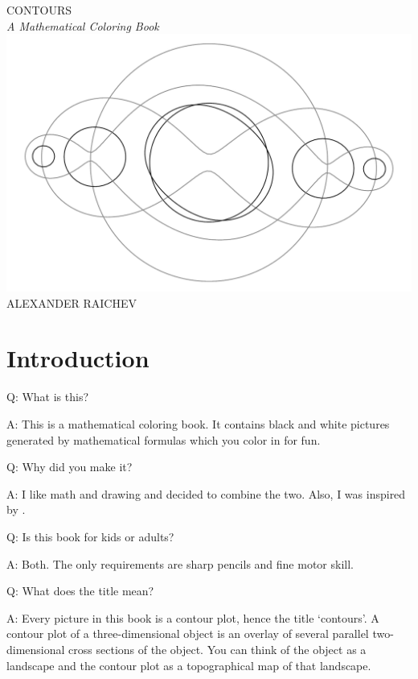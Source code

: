 \documentclass[12pt, a4paper]{amsart}
\begin{document}
\begin{titlepage}

\noindent
\begin{center}
{\fontsize{2cm}{1em}\selectfont CONTOURS}\\[1.5em]
{\LARGE\itshape A Mathematical Coloring Book}\\[4em]
\includegraphics[width=160mm, angle=90]{cover.pdf}\\
\vfill
{\Large ALEXANDER RAICHEV}
\end{center}
\end{titlepage}

\section*{Introduction}

Q: What is this?

A: This is a mathematical coloring book.
It contains black and white pictures generated by mathematical formulas which you color in for fun.

Q: Why did you make it? 

A: I like math and drawing and decided to combine the two.
Also, I was inspired by \cite{Hamp2009}.

Q: Is this book for kids or adults?

A: Both.
The only requirements are sharp pencils and fine motor skill.

Q: What does the title mean? 

A: Every picture in this book is a contour plot, hence the title `contours'. 
A contour plot of a three-dimensional object is an overlay of several parallel two-dimensional cross sections of the object.
You can think of the object as a landscape and the contour plot as a topographical map of that landscape.
\end{document}
